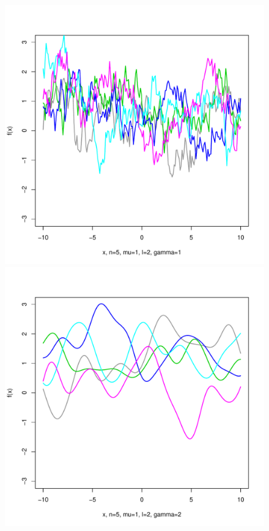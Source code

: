 \documentclass[12pt,letterpaper]{article}
\begin{document}
\begin{figure}
\begin{center}
\includegraphics[scale=0.2]{hw321/n5-m1-l2-g2.pdf}
\includegraphics[scale=0.2]{hw321/n5-m1-l2-g4.pdf}

\end{center}
\end{figure}
\end{document}
